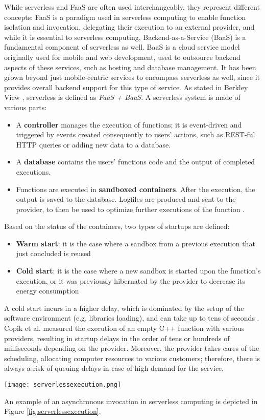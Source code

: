 \documentclass[
	a4paper, %
	12pt,
	twoside, %
]{LTJournalArticle}
\begin{document}
While serverless and FaaS are often used interchangeably, they represent different concepts: FaaS is a paradigm used in serverless computing to enable function isolation and invocation, delegating their execution to an external provider, and while it is essential to serverless computing, Backend-as-a-Service (BaaS) is a fundamental component of serverless as well. BaaS is a cloud service model originally used for mobile and web development, used to outsource backend aspects of these services, such as hosting and database management. It has been grown beyond just mobile-centric services to encompass serverless as well, since it provides overall backend support for this type of service. As stated in Berkley View \cite{jonas_cloud_2019}, serverless is defined as \textit{FaaS + BaaS}. A serverless system is made of various parts:

\begin{itemize}
	\item A \textbf{controller} manages the execution of functions; it is event-driven and triggered by events created consequently to users' actions, such as REST-ful HTTP queries or adding new data to a database.
	\item A \textbf{database} contains the users' functions code and the output of completed executions.
	\item Functions are executed in \textbf{sandboxed containers}. After the execution, the output is saved to the database. Logfiles are produced and sent to the provider, to then be used to optimize further executions of the function \cite{shafiei_serverless_2022}.
\end{itemize}
Based on the status of the containers, two types of startups are defined:

\begin{itemize}
	\item \textbf{Warm start}: it is the case where a sandbox from a previous execution that just concluded is reused
	\item \textbf{Cold start}: it is the case where a new sandbox is started upon the function's execution, or it was previously hibernated by the provider to decrease its energy consumption
\end{itemize}
A cold start incurs in a higher delay, which is dominated by the setup of the software environment (e.g. libraries loading), and can take up to tens of seconds \cite{jonas_cloud_2019}. Copik et al. \cite{copik_rfaas_2023} measured the execution of an empty C++ function with various providers, resulting in startup delays in the order of tens or hundreds of milliseconds depending on the provider. Moreover, the provider takes cares of the scheduling, allocating computer resources to various customers; therefore, there is always a risk of queuing delays in case of high demand for the service.
\begin{figure*}[!htb]
	\texttt{[image: serverlessexecution.png]}
	\caption{Example of an asynchronous invocation. Source: \cite{li_serverless_2022}}
	\label{fig:serverlessexecution}
\end{figure*}
An example of an asynchronous invocation in serverless computing is depicted in Figure \ref{fig:serverlessexecution}. 
\end{document}
